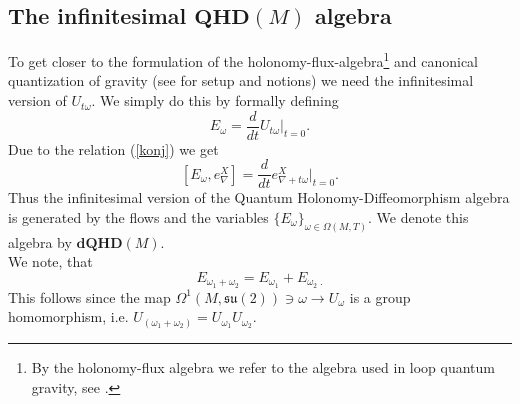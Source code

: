 \documentclass[12pt]{article}
\def\cp{{\cal P}}
\begin{document}




\subsection{The infinitesimal $\mathbf{QHD}(M)$ algebra}

To get closer to the formulation of the holonomy-flux-algebra\footnote{By the holonomy-flux algebra we refer to the algebra used in loop quantum gravity, see \cite{AL1}.} and canonical quantization of gravity (see \cite{Aastrup:2012jj} for setup and notions) we need the infinitesimal version of $U_{t \omega}$. We simply do this by formally defining 
$$E_\omega  =\frac{d}{dt}U_{  t  \omega}|_{t=0} . $$
Due to the relation (\ref{konj}) we get 
\begin{equation} \label{flowkan}
[ E_\omega , e^X_\nabla ]= \frac{d}{dt}e^X_{\nabla +t\omega}|_{t=0}  . 
\end{equation}
Thus the infinitesimal version of the Quantum Holonomy-Diffeomorphism algebra is generated by the flows and the variables $\{ E_\omega\}_{\omega \in \Omega (M,T)}$. We denote this algebra by $\mathbf{dQHD}(M)$. \\

We note, that 
$$
E_{\omega_1+\omega_2}=E_{\omega_1}+E_{\omega_2\;.}
$$
This follows since the map $\Omega^1 (M,\mathfrak{su}(2))\ni \omega \to U_{ \omega}$ is a group homomorphism, i.e. $U_{(\omega_1+\omega_2 )}=U_{\omega_1}U_{ \omega_2}$. \\
\end{document}
